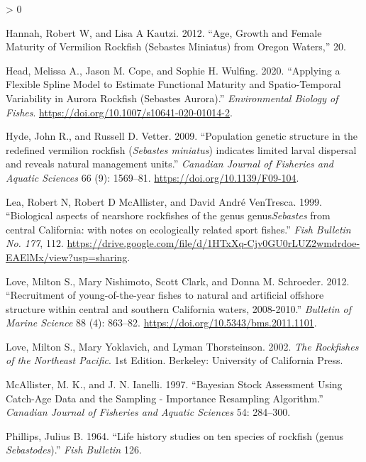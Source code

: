 \documentclass[11pt,
  english,
  a4paper,
]{article}
\newlength{\cslhangindent}
\newenvironment{CSLReferences}[2] %
 {%
  \setlength{\parindent}{0pt}
  \ifodd #1 \everypar{\setlength{\hangindent}{\cslhangindent}}\ignorespaces\fi
  \ifnum #2 > 0
  \setlength{\parskip}{#2\baselineskip}
  \fi
 }%
 {}
\begin{document}
\begin{CSLReferences}{1}{0}
\leavevmode\hypertarget{ref-hannah_age_2012}{}%
Hannah, Robert W, and Lisa A Kautzi. 2012. {``Age, Growth and Female Maturity of Vermilion Rockfish (Sebastes Miniatus) from Oregon Waters,''} 20.

\leavevmode\hypertarget{ref-head_fxnalmatspline_2020}{}%
Head, Melissa A., Jason M. Cope, and Sophie H. Wulfing. 2020. {``Applying a Flexible Spline Model to Estimate Functional Maturity and Spatio-Temporal Variability in Aurora Rockfish (Sebastes Aurora).''} \emph{Environmental Biology of Fishes}. \url{https://doi.org/10.1007/s10641-020-01014-2}.

\leavevmode\hypertarget{ref-Hyde2009}{}%
Hyde, John R., and Russell D. Vetter. 2009. {``{Population genetic structure in the redefined vermilion rockfish (\emph{Sebastes miniatus}) indicates limited larval dispersal and reveals natural management units}.''} \emph{Canadian Journal of Fisheries and Aquatic Sciences} 66 (9): 1569--81. \url{https://doi.org/10.1139/F09-104}.

\leavevmode\hypertarget{ref-Lea1999}{}%
Lea, Robert N, Robert D McAllister, and David André VenTresca. 1999. {``{Biological aspects of nearshore rockfishes of the genus genus\emph{Sebastes} from central California: with notes on ecologically related sport fishes}.''} \emph{Fish Bulletin No. 177}, 112. \url{https://drive.google.com/file/d/1HTxXq-Cjv0GU0rLUZ2wmdrdoe-EAElMx/view?usp=sharing}.

\leavevmode\hypertarget{ref-Love2012a}{}%
Love, Milton S., Mary Nishimoto, Scott Clark, and Donna M. Schroeder. 2012. {``{Recruitment of young-of-the-year fishes to natural and artificial offshore structure within central and southern California waters, 2008-2010}.''} \emph{Bulletin of Marine Science} 88 (4): 863--82. \url{https://doi.org/10.5343/bms.2011.1101}.

\leavevmode\hypertarget{ref-love_rockfishes_2002}{}%
Love, Milton S., Mary Yoklavich, and Lyman Thorsteinson. 2002. \emph{The Rockfishes of the Northeast Pacific}. 1st Edition. Berkeley: University of California Press.

\leavevmode\hypertarget{ref-mcallister_bayesian_1997}{}%
McAllister, M. K., and J. N. Ianelli. 1997. {``Bayesian Stock Assessment Using Catch-Age Data and the Sampling - Importance Resampling Algorithm.''} \emph{Canadian Journal of Fisheries and Aquatic Sciences} 54: 284--300.

\leavevmode\hypertarget{ref-Phillips1964}{}%
Phillips, Julius B. 1964. {``{Life history studies on ten species of rockfish (genus \emph{Sebastodes})}.''} \emph{Fish Bulletin} 126.


\end{CSLReferences}
\end{document}
